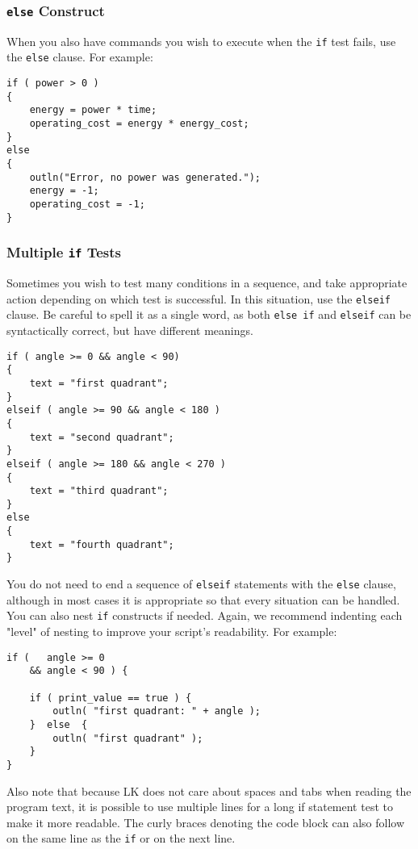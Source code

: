 \documentclass{article}
\begin{document}
\subsubsection{\texttt{else} Construct}

When you also have commands you wish to execute when the \texttt{if} test fails, use the \texttt{else} clause. For example:

\begin{verbatim}
if ( power > 0 )
{
    energy = power * time;
    operating_cost = energy * energy_cost;
}
else
{
    outln("Error, no power was generated.");
    energy = -1;
    operating_cost = -1;
}
\end{verbatim}

\subsubsection{Multiple \texttt{if} Tests}

Sometimes you wish to test many conditions in a sequence, and take appropriate action depending on which test is successful.  In this situation, use the \texttt{elseif} clause.  Be careful to spell it as a single word, as both \texttt{else if} and \texttt{elseif} can be syntactically correct, but have different meanings.

\begin{verbatim}
if ( angle >= 0 && angle < 90)
{
    text = "first quadrant";
}
elseif ( angle >= 90 && angle < 180 )
{
    text = "second quadrant";
}
elseif ( angle >= 180 && angle < 270 )
{
    text = "third quadrant";
}
else
{
    text = "fourth quadrant";
}
\end{verbatim}

You do not need to end a sequence of \texttt{elseif} statements with the \texttt{else} clause, although in most cases it is appropriate so that every situation can be handled.  You can also nest \texttt{if} constructs if needed.  Again, we recommend indenting each "level" of nesting to improve your script's readability.  For example:

\begin{verbatim}
if (   angle >= 0 
    && angle < 90 ) {
    
    if ( print_value == true ) {
        outln( "first quadrant: " + angle );
    }  else  {
        outln( "first quadrant" );
    }
}
\end{verbatim}

Also note that because LK does not care about spaces and tabs when reading the program text, it is possible to use multiple lines for a long if statement test to make it more readable.  The curly braces denoting the code block can also follow on the same line as the \texttt{if} or on the next line.
\end{document}
